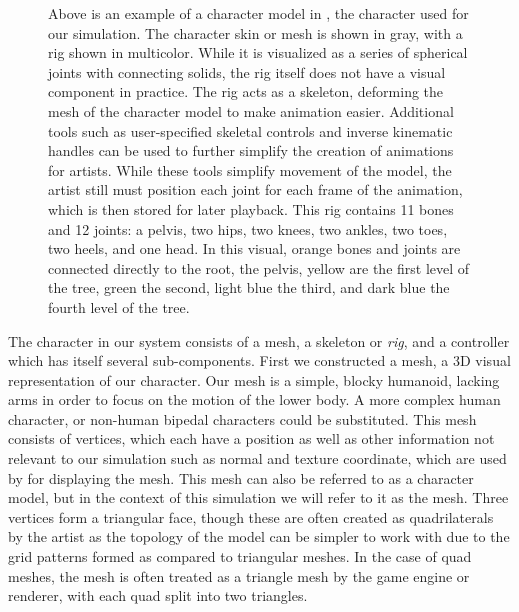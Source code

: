 \begin{figure}[htp]
\begin{subfigure}[b]{0.3\textwidth}
	\end{subfigure}
	\caption[Example of Rigged 3D Character Model]{Above is an example of a character model in \maya{}, the character used for our simulation.  The character skin or mesh is shown in gray, with a rig shown in multicolor.  While it is visualized as a series of spherical joints with connecting solids, the rig itself does not have a visual component in practice.  The rig acts as a skeleton, deforming the mesh of the character model to make animation easier.  Additional tools such as user-specified skeletal controls and inverse kinematic handles can be used to further simplify the creation of animations for artists.  While these tools simplify movement of the model, the artist still must position each joint for each frame of the animation, which is then stored for later playback.  This rig contains 11 bones and 12 joints: a pelvis, two hips, two knees, two ankles, two toes, two heels, and one head.  In this visual, orange bones and joints are connected directly to the root, the pelvis, yellow are the first level of the tree, green the second, light blue the third, and dark blue the fourth level of the tree.}
	\label{fig:rig_character}
\end{figure}

The character in our system consists of a mesh, a skeleton or \emph{rig}, and a controller which has itself several sub-components.  First we constructed a mesh, a 3D visual representation of our character.  Our mesh is a simple, blocky humanoid, lacking arms in order to focus on the motion of the lower body.  A more complex human character, or non-human bipedal characters could be substituted.  This mesh consists of vertices, which each have a position as well as other information not relevant to our simulation such as normal and texture coordinate, which are used by \unity{} for displaying the mesh.  This mesh can also be referred to as a character model, but in the context of this simulation we will refer to it as the mesh.  Three vertices form a triangular face, though these are often created as quadrilaterals by the artist as the topology of the model can be simpler to work with due to the grid patterns formed as compared to triangular meshes.  In the case of quad meshes, the mesh is often treated as a triangle mesh by the game engine or renderer, with each quad split into two triangles.

